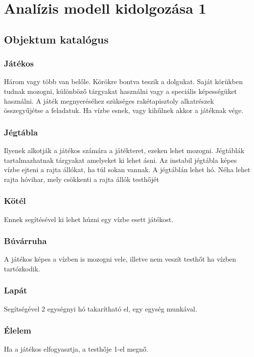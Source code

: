 %
\chapter{Analízis modell kidolgozása 1}

\thispagestyle{fancy}

\section{Objektum katalógus}

\subsection{Játékos}
Három vagy több van belőle. Körökre bontva teszik a dolgukat. Saját körükben tudnak mozogni, különböző tárgyakat használni vagy a speciális képességüket használni. A játék megnyeréséhez szükséges rakétapisztoly alkatrészek összegyűjétse a feladatuk. Ha vízbe esnek, vagy kihűlnek akkor a játéknak vége.

\subsection{Jégtábla}
Ilyenek alkotják a játékos számára a játékteret, ezeken lehet mozogni. Jégtáblák tartalmazhatnak tárgyakat amelyeket ki lehet ásni. Az instabil jégtábla képes vízbe ejteni a rajta állókat, ha túl sokan vannak. A jégtáblán lehet hó. Néha lehet rajta hóvihar, mely csökkenti a rajta állók testhőjét

\subsection{Kötél}
Ennek segítésével ki lehet húzni egy vízbe esett játékost.

\subsection{Búvárruha}
A játékos képes a vízben is mozogni vele, illetve nem veszít testhőt ha vízben tartózkodik.

\subsection{Lapát}
Segítségével 2 egységnyi hó takarítható el, egy egység munkával.

\subsection{Élelem}
Ha a játékos elfogyasztja, a testhője 1-el megnő.

